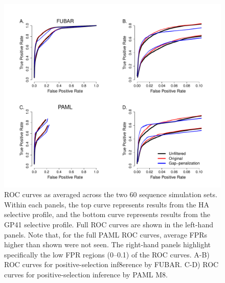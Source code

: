 \documentclass[11pt]{article}
\begin{document}
\begin{figure}[H]
\centerline{\includegraphics[width=6in]{Figures/ROC_prk.pdf}}
\caption{\label{roc} ROC curves as averaged across the two 60 sequence simulation sets. Within each panels, the top curve represents results from the HA selective profile, and the bottom curve represents results from the GP41 selective profile. Full ROC curves are shown in the left-hand panels. Note that, for the full PAML ROC curves, average FPRs higher than shown were not seen. The right-hand panels highlight specifically the low FPR regions (0--0.1) of the ROC curves. A-B) ROC curves for positive-selection inf8erence by FUBAR. C-D) ROC curves for positive-selection inference by PAML M8.}
\end{figure}
\end{document}
